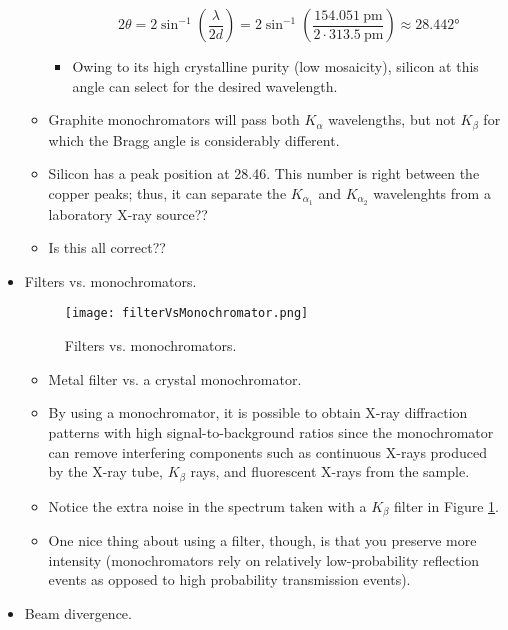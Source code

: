 \documentclass[../notes.tex]{subfiles}
\begin{document}
\begin{itemize}
\begin{itemize}
\begin{itemize}
            \begin{equation*}
                2\theta = 2\sin^{-1}\left( \frac{\lambda}{2d} \right)
                = 2\sin^{-1}\left( \frac{\SI{154.051}{\pico\meter}}{2\cdot\SI{313.5}{\pico\meter}} \right)
                \approx \ang{28.442}
            \end{equation*}
            \item Owing to its high crystalline purity (low mosaicity), silicon at this angle can select for the desired wavelength.
        \end{itemize}
        \item Graphite monochromators will pass both $K_\alpha$ wavelengths, but not $K_\beta$ for which the Bragg angle is considerably different.
        \item Silicon has a peak position at 28.46. This number is right between the copper peaks; thus, it can separate the $K_{\alpha_1}$ and $K_{\alpha_2}$ wavelenghts from a laboratory X-ray source??
        \item Is this all correct??
    \end{itemize}
    \item Filters vs. monochromators.
    \begin{figure}[h!]
        \centering
        \texttt{[image: filterVsMonochromator.png]}
        \caption{Filters vs. monochromators.}
        \label{fig:filterVsMonochromator}
    \end{figure}
    \begin{itemize}
        \item Metal filter vs. a crystal monochromator.
        \item By using a monochromator, it is possible to obtain X-ray diffraction patterns with high signal-to-background ratios since the monochromator can remove interfering components such as continuous X-rays produced by the X-ray tube, $K_\beta$ rays, and fluorescent X-rays from the sample.
        \item Notice the extra noise in the spectrum taken with a $K_\beta$ filter in Figure \ref{fig:filterVsMonochromator}.
        \item One nice thing about using a filter, though, is that you preserve more intensity (monochromators rely on relatively low-probability reflection events as opposed to high probability transmission events).
    \end{itemize}
    \item Beam divergence.
    \begin{figure}[H]

\end{figure}
\end{itemize}
\end{document}
